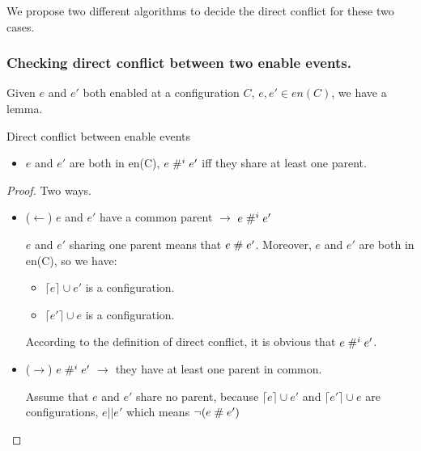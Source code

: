 \documentclass{llncs}
\begin{document}
We propose two different algorithms to decide the direct conflict for these two cases.

\subsubsection{Checking direct conflict between two enable events.}
Given $e$ and $e'$ both enabled at a configuration $C$, $e, e' \in en(C)$, we have a lemma.
	
	\begin{lemma}{Direct conflict between enable events}
		\begin{itemize}
			\item
			$e$ and $e'$ are both in en(C), $e \mathrel{\#^i_{}} e'$ iff they share at least one parent.		
		\end{itemize}
		\label{thm:lem1}
	\end{lemma}
	
	\begin{proof}
	Two ways.
		\begin{itemize}
		\item
			($\leftarrow$) $e$ and $e'$ have a common parent $\rightarrow$ $e \mathrel{\#^i_{}} e'$
			
			$e$ and $e'$ sharing one parent means that  $e \mathrel{\#} e'$. Moreover, $e$ and $e'$ are both 
			in en(C), so we have:
			\begin{itemize}
			\item
				$\lceil e \rceil \cup e'$ is a configuration.
			\item
				$\lceil e' \rceil \cup e$ is a configuration.
			\end{itemize} 
			According to the definition of direct conflict, it is obvious that $e \mathrel{\#^i_{}} e'$.
			
		\item
			($\rightarrow$) $e \mathrel{\#^i_{}} e'$ $\rightarrow$ they have at least one parent in common.
			
			Assume that $e$ and $e'$ share no parent, because $\lceil e \rceil \cup e'$ and $\lceil
			e' \rceil \cup e$ are configurations, $e || e'$ which means $\lnot (e \mathrel{\#} e')$
		\end{itemize}			
	\end{proof}			
	
\end{document}
